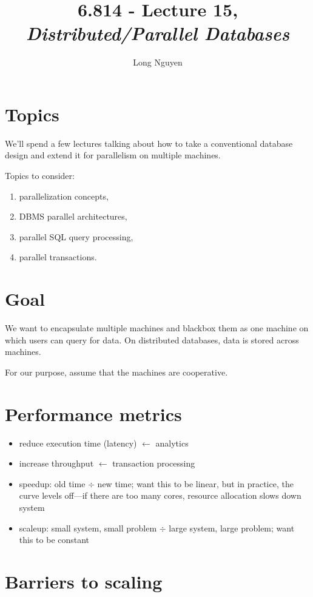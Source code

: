 \documentclass{article}
\title{6.814 - Lecture 15, \emph{Distributed/Parallel Databases}}
\author{Long Nguyen}
\begin{document}
\maketitle

\section{Topics}

We'll spend a few lectures talking about how to take a conventional database design and extend it for parallelism on multiple machines.

Topics to consider:
\begin{enumerate}
    \item parallelization concepts,
    \item DBMS parallel architectures,
    \item parallel SQL query processing,
    \item parallel transactions.
\end{enumerate}

\section{Goal}

We want to encapsulate multiple machines and blackbox them as one machine on which users can query for data. On distributed databases, data is stored across machines.

For our purpose, assume that the machines are cooperative.

\section{Performance metrics}

\begin{itemize}
    \item reduce execution time (latency) $\leftarrow$ analytics
    \item increase throughput $\leftarrow$ transaction processing
    \item speedup: old time $\div$ new time; want this to be linear, but in practice, the curve levels off---if there are too many cores, resource allocation slows down system
    \item scaleup: small system, small problem $\div$ large system, large problem; want this to be constant
\end{itemize} 

\section{Barriers to scaling}
\end{document}
